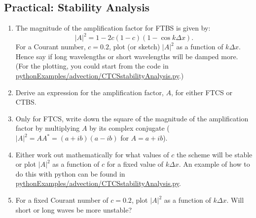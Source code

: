 \subsection{Practical: Stability Analysis}

\begin{enumerate}
\item The magnitude of the amplification factor for FTBS is given by:
\[
|A|^2 = 1 -2c(1-c)(1-\cos k\Delta x).
\]
For a Courant number, $c=0.2$, plot (or sketch) $|A|^2$ as a function of $k\Delta x$. Hence say if long wavelengths or short wavelengths will be damped more. (For the plotting, you could start from the code in \url{pythonExamples/advection/CTCSstabilityAnalysis.py}.)


\item Derive an expression for the amplification factor, $A$, for either FTCS or CTBS.
\\ 
\item Only for FTCS, write down the square of the magnitude of the amplification factor by multiplying $A$ by its complex conjugate ($|A|^2= A A^* = (a+ib)(a-ib)$ for $A=a+ib$).
\\ 

\item Either work out mathematically for what values of $c$ the scheme will be stable or plot $|A|^2$ as a function of $c$ for a fixed value of $k\Delta x$. An example of how to do this with python can be found in \url{pythonExamples/advection/CTCSstabilityAnalysis.py}.
\\ 

\item For a fixed Courant number of $c=0.2$, plot $|A|^2$ as a function of $k\Delta x$. Will short or long waves be more unstable?
\\ 
\end{enumerate}

